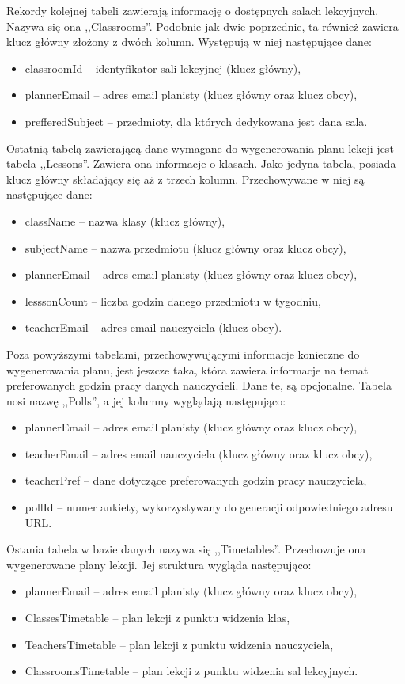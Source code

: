 Rekordy kolejnej tabeli zawierają informację o dostępnych salach lekcyjnych. Nazywa się ona ,,Classrooms''. Podobnie jak dwie poprzednie, ta również zawiera klucz główny złożony z dwóch kolumn. Występują w niej następujące dane:
\begin{itemize}
	\item classroomId -- identyfikator sali lekcyjnej (klucz główny),
	\item plannerEmail -- adres email planisty (klucz główny oraz klucz obcy),
	\item prefferedSubject -- przedmioty, dla których dedykowana jest dana sala.
\end{itemize}

Ostatnią tabelą zawierającą dane wymagane do wygenerowania planu lekcji jest tabela ,,Lessons''. Zawiera ona informacje o klasach. Jako jedyna tabela, posiada klucz główny składający się aż z trzech kolumn. Przechowywane w niej są następujące dane:
\begin{itemize}
	\item className -- nazwa klasy (klucz główny),
	\item subjectName -- nazwa przedmiotu (klucz główny oraz klucz obcy),
	\item plannerEmail -- adres email planisty (klucz główny oraz klucz obcy),
	\item lesssonCount -- liczba godzin danego przedmiotu w tygodniu,
	\item teacherEmail -- adres email nauczyciela (klucz obcy).
\end{itemize}

Poza powyższymi tabelami, przechowywującymi informacje konieczne do wygenerowania planu, jest jeszcze taka, która zawiera informacje na temat preferowanych godzin pracy danych nauczycieli. Dane te, są opcjonalne. Tabela nosi nazwę ,,Polls'', a jej kolumny wyglądają następująco:
\begin{itemize}
	\item plannerEmail -- adres email planisty (klucz główny oraz klucz obcy),
	\item teacherEmail -- adres email nauczyciela (klucz główny oraz klucz obcy),
	\item teacherPref --  dane dotyczące preferowanych godzin pracy nauczyciela,
	\item pollId -- numer ankiety, wykorzystywany do generacji odpowiedniego adresu URL.
\end{itemize}
 
Ostania tabela w bazie danych nazywa się ,,Timetables''. Przechowuje ona wygenerowane plany lekcji. Jej struktura wygląda następująco:
\begin{itemize}
	\item plannerEmail -- adres email planisty (klucz główny oraz klucz obcy),
	\item ClassesTimetable -- plan lekcji z punktu widzenia klas,
	\item TeachersTimetable --  plan lekcji z punktu widzenia nauczyciela,
	\item ClassroomsTimetable -- plan lekcji z punktu widzenia sal lekcyjnych.
\end{itemize}

